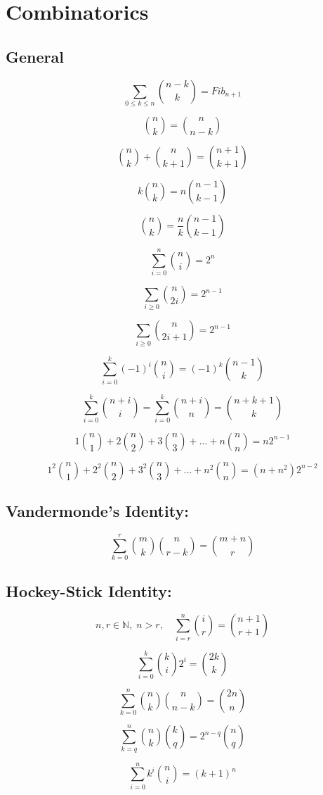 \documentclass{article}
\begin{document}
\section*{Combinatorics}

\subsection*{General}

\[
\sum_{0 \leq k \leq n} \binom{n-k}{k} = Fib_{n+1}
\]

\[
\binom{n}{k} = \binom{n}{n-k}
\]

\[
\binom{n}{k} + \binom{n}{k+1} = \binom{n+1}{k+1}
\]

\[
k \binom{n}{k} = n \binom{n-1}{k-1}
\]

\[
\binom{n}{k} = \frac{n}{k} \binom{n-1}{k-1}
\]

\[
\sum_{i=0}^n \binom{n}{i} = 2^n
\]

\[
\sum_{i \geq 0} \binom{n}{2i} = 2^{n-1}
\]

\[
\sum_{i \geq 0} \binom{n}{2i+1} = 2^{n-1}
\]

\[
\sum_{i=0}^k (-1)^i \binom{n}{i} = (-1)^k \binom{n-1}{k}
\]

\[
\sum_{i=0}^k \binom{n+i}{i} = \sum_{i=0}^k \binom{n+i}{n} = \binom{n+k+1}{k}
\]

\[
1\binom{n}{1} + 2\binom{n}{2} + 3\binom{n}{3} + \dots + n\binom{n}{n} = n2^{n-1}
\]

\[
1^2 \binom{n}{1} + 2^2 \binom{n}{2} + 3^2 \binom{n}{3} + \dots + n^2 \binom{n}{n} = (n+n^2)2^{n-2}
\]


\subsection{Vandermonde’s Identity:}
\[
\sum_{k=0}^r \binom{m}{k}\binom{n}{r-k} = \binom{m+n}{r}
\]


\subsection{Hockey-Stick Identity:}
\[
n,r \in \mathbb{N}, \; n>r, \quad \sum_{i=r}^n \binom{i}{r} = \binom{n+1}{r+1}
\]

\[
\sum_{i=0}^k \binom{k}{i}2^i = \binom{2k}{k}
\]

\[
\sum_{k=0}^n \binom{n}{k}\binom{n}{n-k} = \binom{2n}{n}
\]

\[
\sum_{k=q}^n \binom{n}{k}\binom{k}{q} = 2^{n-q}\binom{n}{q}
\]

\[
\sum_{i=0}^n k^i \binom{n}{i} = (k+1)^n
\]
\end{document}

